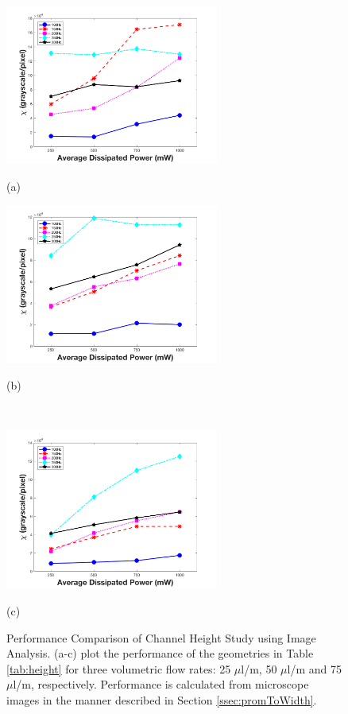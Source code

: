 \begin{figure}[H]
  \begin{minipage}[t]{0.49\linewidth}\centering
    \includegraphics[width=7cm]{HeightPlot25ul}
    \medskip
    \centerline{(a)}
  \end{minipage}\hfill
  \begin{minipage}[t]{0.49\linewidth}\centering
    \includegraphics[width=7cm]{HeightPlot50ul}
    \medskip
    \centerline{(b)}\\
  \end{minipage}
  \begin{minipage}[t]{0.99\linewidth}\centering
    \includegraphics[width=7cm]{HeightPlot75ul}
    \medskip
    \centerline{(c)}
  \end{minipage}
  \caption[Performance Comparison of Channel Height Study using Image Analysis]{Performance Comparison of Channel Height Study using Image Analysis. (a-c) plot the performance of the geometries in Table \ref{tab:height} for three volumetric flow rates: 25 $\mu$l/m, 50 $\mu$l/m and 75 $\mu$l/m, respectively. Performance is calculated from microscope images in the manner described in Section \ref{ssec:promToWidth}.}
	\label{fig:heightPlot}
\end{figure}



